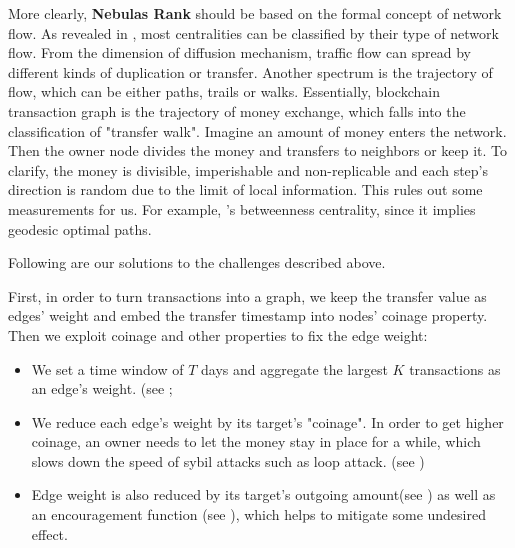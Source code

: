More clearly, \textbf{Nebulas Rank} should be based on the formal concept of network flow. As revealed in \cite{Borgatti2005}, most centralities can be classified by their type of network flow. From the dimension of diffusion mechanism, traffic flow can spread by different kinds of duplication or transfer. Another spectrum is the trajectory of flow, which can be either paths, trails or walks. Essentially, blockchain transaction graph is the trajectory of money exchange, which falls into the classification of "transfer walk". Imagine an amount of money enters the network. Then the owner node divides the money and transfers to neighbors or keep it. To clarify, the money is divisible, imperishable and non-replicable and each step's direction is random due to the limit of local information. This rules out some measurements for us. For example, \textcite{freeman1977set}'s betweenness centrality, since it implies geodesic optimal paths.

Following are our solutions to the challenges described above.

First, in order to turn transactions into a graph, we keep the transfer value as edges' weight and embed the transfer timestamp into nodes' coinage property. Then we exploit coinage and other properties to fix the edge weight:
\begin{itemize}
	\item We set a time window of $T$ days and aggregate the largest $K$ transactions as an edge's weight. (see ;
	\item We reduce each edge's weight by its target's "coinage". In order to get higher coinage, an owner needs to let the money stay in place for a while, which slows down the speed of sybil attacks such as loop attack. (see )
	\item Edge weight is also reduced by its target's outgoing amount(see ) as well as an encouragement function (see ), which helps to mitigate some undesired effect.
\end{itemize}

